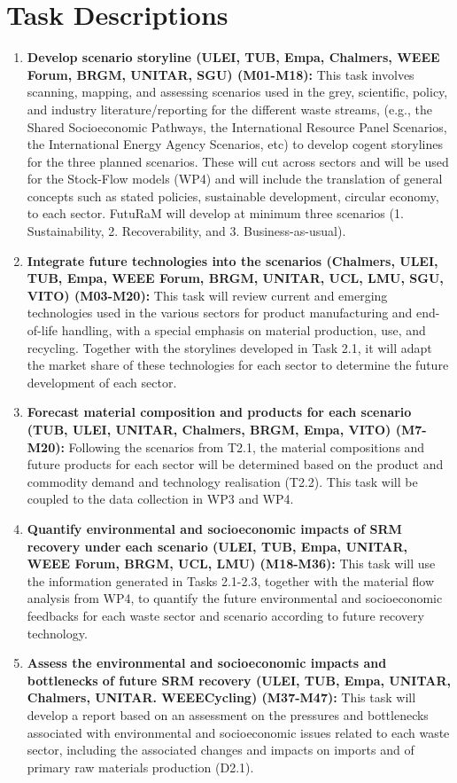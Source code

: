 \section{Task Descriptions}
\begin{enumerate}[label=Task 2.\arabic*., style=nextline]
    \item \textbf{Develop scenario storyline (ULEI, TUB, Empa, Chalmers, WEEE Forum, BRGM, UNITAR, SGU) (M01-M18):}
    This task involves scanning, mapping, and assessing scenarios used in the grey, scientific, policy, and industry literature/reporting for the different waste streams, (e.g., the Shared Socioeconomic Pathways, the International Resource Panel Scenarios, the International Energy Agency Scenarios, etc) to develop cogent storylines for the three planned scenarios. These will cut across sectors and will be used for the Stock-Flow models (WP4) and will include the translation of general concepts such as stated policies, sustainable development, circular economy, to each sector. FutuRaM will develop at minimum three scenarios (1. Sustainability, 2. Recoverability, and 3. Business-as-usual).

    \item \textbf{Integrate future technologies into the scenarios (Chalmers, ULEI, TUB, Empa, WEEE Forum, BRGM, UNITAR, UCL, LMU, SGU, VITO) (M03-M20):}
    This task will review current and emerging technologies used in the various sectors for product manufacturing and end-of-life handling, with a special emphasis on material production, use, and recycling. Together with the storylines developed in Task 2.1, it will adapt the market share of these technologies for each sector to determine the future development of each sector.

    \item \textbf{Forecast material composition and products for each scenario (TUB, ULEI, UNITAR, Chalmers, BRGM, Empa, VITO) (M7-M20):}
    Following the scenarios from T2.1, the material compositions and future products for each sector will be determined based on the product and commodity demand and technology realisation (T2.2). This task will be coupled to the data collection in WP3 and WP4.

    \item \textbf{Quantify environmental and socioeconomic impacts of SRM recovery under each scenario (ULEI, TUB, Empa, UNITAR, WEEE Forum, BRGM, UCL, LMU) (M18-M36):}
    This task will use the information generated in Tasks 2.1-2.3, together with the material flow analysis from WP4, to quantify the future environmental and socioeconomic feedbacks for each waste sector and scenario according to future recovery technology.

    \item \textbf{Assess the environmental and socioeconomic impacts and bottlenecks of future SRM recovery (ULEI, TUB, Empa, UNITAR, Chalmers, UNITAR. WEEECycling) (M37-M47):}
    This task will develop a report based on an assessment on the pressures and bottlenecks associated with environmental and socioeconomic issues related to each waste sector, including the associated changes and impacts on imports and of primary raw materials production (D2.1).
\end{enumerate}

